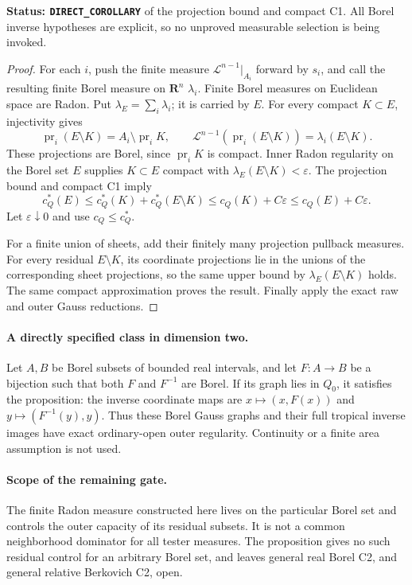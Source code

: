 \documentclass[11pt,a4paper]{article}
\numberwithin{equation}{section}
\theoremstyle{definition}
\theoremstyle{remark}
\begin{document}
\noindent\textbf{Status: \texttt{DIRECT\_COROLLARY}} of the
projection bound and compact C1. All Borel inverse hypotheses are
explicit, so no unproved measurable selection is being invoked.

\begin{proof}
For each $i$, push the finite measure $\mathcal L^{n-1}|_{A_i}$
forward by $s_i$, and call the resulting finite Borel measure on
$\mathbf R^n$ $\lambda_i$. Finite Borel measures on Euclidean space
are Radon. Put $\lambda_E=\sum_i\lambda_i$; it is carried by $E$.
For every compact $K\subset E$, injectivity gives
\[
 \operatorname{pr}_i(E\setminus K)=A_i\setminus\operatorname{pr}_iK,
 \qquad
 \mathcal L^{n-1}(\operatorname{pr}_i(E\setminus K))
                             =\lambda_i(E\setminus K).
\]
These projections are Borel, since $\operatorname{pr}_iK$ is compact.
Inner Radon regularity on the Borel set $E$ supplies $K\subset E$
compact with $\lambda_E(E\setminus K)<\varepsilon$. The projection
bound and compact C1 imply
\[
 c_Q^*(E)\le c_Q^*(K)+c_Q^*(E\setminus K)
       \le c_Q(K)+C\varepsilon\le c_Q(E)+C\varepsilon.
\]
Let $\varepsilon\downarrow0$ and use $c_Q\le c_Q^*$.

For a finite union of sheets, add their finitely many projection
pullback measures. For every residual $E\setminus K$, its coordinate
projections lie in the unions of the corresponding sheet projections,
so the same upper bound by $\lambda_E(E\setminus K)$ holds. The same
compact approximation proves the result. Finally apply the exact raw
and outer Gauss reductions.
\end{proof}

\paragraph{A directly specified class in dimension two.}
Let $A,B$ be Borel subsets of bounded real intervals, and let
$F:A\to B$ be a bijection such that both $F$ and $F^{-1}$ are Borel.
If its graph lies in $Q_0$, it satisfies the proposition: the inverse
coordinate maps are $x\mapsto(x,F(x))$ and
$y\mapsto(F^{-1}(y),y)$. Thus these Borel Gauss graphs and their full
tropical inverse images have exact ordinary-open outer regularity.
Continuity or a finite area assumption is not used.

\paragraph{Scope of the remaining gate.}
The finite Radon measure constructed here lives on the particular
Borel set and controls the outer capacity of its residual subsets.
It is not a common neighborhood dominator for all tester measures.
The proposition gives no such residual control for an arbitrary
Borel set, and leaves general real Borel C2, and general relative
Berkovich C2, open.
\end{document}
